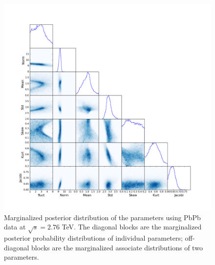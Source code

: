 \documentclass[aps,prl,twocolumn,groupedaddress]{revtex4-1}
\begin{document}
	\begin{figure}
	\begin{center}
	\includegraphics[width=\columnwidth]{pics/corner-PbPb.png}
	\caption{Marginalized posterior distribution of the parameters using PbPb data at $\sqrt{s} = 2.76$ TeV. The diagonal blocks are the marginalized posterior probability distributions of individual parameters; off-diagonal blocks are the marginalized associate distributions of two parameters.}\label{corner-PbPb}
	\end{center}
	\end{figure}
	
\end{document}
